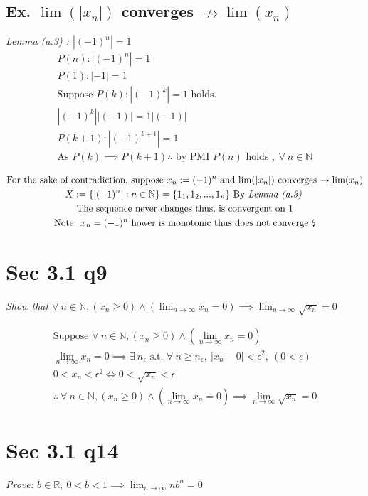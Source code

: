 \documentclass[11pt]{article}
\newcommand{\question}[1]{
    \begin{mdframed}[
        linecolor=gray,       %
        linewidth=0.5pt,      %
        innertopmargin=10pt,  %
        innerbottommargin=10pt %
    ]
    \centering \itshape #1
    \end{mdframed}
}
\newcommand{\subp}[1]{
    \begin{mdframed}[
        linewidth=0.5pt,      %
        innertopmargin=10pt,  %
        innerbottommargin=10pt %
    ]
    \centering \itshape #1
    \end{mdframed}
}
\theoremstyle{plain}
\begin{document}
\subsection*{Ex. \small{$\lim(|x_n|)$ converges $\nrightarrow  \lim(x_n)$}} \vspace{1em}
\subp{
	Lemma (a.3) : $|(-1)^n| = 1$
	\[
		\begin{gathered}
			P(n): |(-1)^n| = 1 \\
			P(1): |-1| = 1 \\
			\text{Suppose } P(k): |(-1)^k| = 1 \text{ holds.}\\
			|(-1)^k| |(-1)| = 1 |(-1)| \\
			P(k+1): |(-1)^{k+1}| = 1 \\
			\text{As } P(k) \implies P(k+1) \therefore \text{ by PMI } P(n) \text{ holds }, ~\forall ~n \in \mathbb{N}
		\end{gathered}
	\]
}
\[
	\begin{gathered}
		\text{For the sake of contradiction, suppose $x_n := (-1)^n$ and \text{$\lim(|x_n|)$ converges $\rightarrow  \lim(x_n)$}} \\
		X := \{ |(-1)^n| : n \in \mathbb{N} \} = \{ 1_1,1_2,...,1_n \} \text{ By \textit{Lemma (a.3)} } \\
		\text{The sequence never changes thus, is convergent on $1$} \\
		\text{Note: $x_n = (-1)^n$ hower is monotonic thus does not converge \lightning}
	\end{gathered}
\]
\section*{ Sec 3.1 q9}
\question{ Show that $\forall ~n \in \mathbb{N}, (x_n \geq 0) \land (\lim_{n \to \infty}x_n = 0) \implies \lim_{n \to \infty} \sqrt{x_n} = 0$ }
\[
	\begin{gathered}
		\text{Suppose } \forall ~n \in \mathbb{N}, (x_n \geq 0) \land (\lim_{n \to \infty}x_n = 0) \\
		\lim_{n \to \infty}x_n = 0 \implies \exists ~n_\epsilon \text{ s.t. } \forall ~n \geq n_\epsilon, ~|x_n - 0| < \epsilon^2, ~(0 < \epsilon)  \\
		0 < x_n < \epsilon^2 \iff 0 < \sqrt{x_n} < \epsilon \\
		\therefore~ \forall ~n \in \mathbb{N}, (x_n \geq 0) \land (\lim_{n \to \infty}x_n = 0) \implies \lim_{n \to \infty} \sqrt{x_n} = 0
	\end{gathered}
\]
\section*{ Sec 3.1 q14}
\question{ Prove: $b \in \mathbb{R}, ~0<b<1 \implies \lim_{n \to \infty} nb^n = 0$ } \vspace{1em}
\end{document}

